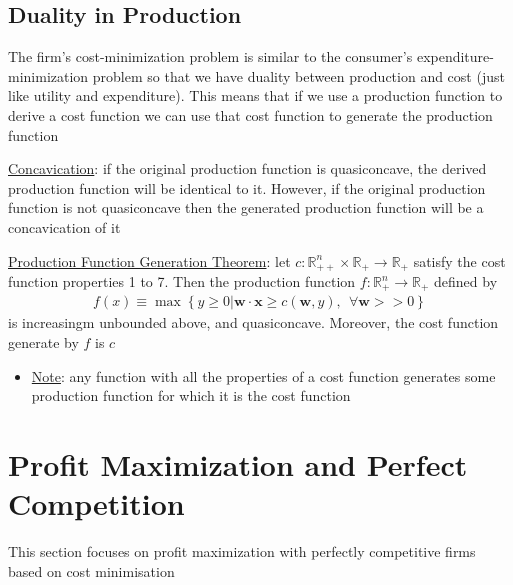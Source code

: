 \documentclass{article}
\begin{document}
\subsection{Duality in Production}
The firm's cost-minimization problem is similar to the consumer's expenditure-minimization problem so that we have duality between production and cost (just like utility and expenditure). This means that if we use a production function to derive a cost function we can use that cost function to generate the production function \par \vspace{0.3em}
  \underline{Concavication}: if the original production function is quasiconcave, the derived production function will be identical to it. However, if the original production function is not quasiconcave then the generated production function will be a concavication of it
  \par
  \underline{Production Function Generation Theorem}: let $c: \mathbb{R}_{++}^{n} \times \mathbb{R}_{+} \rightarrow \mathbb{R}_{+}$ satisfy the cost function properties 1 to 7. Then the production function $f: \mathbb{R}_{+}^{n} \rightarrow \mathbb{R}_{+}$ defined by
  \begin{gather*}
    f(x) \equiv \max \left\{ y \geq 0 | \mathbf{w} \cdot \mathbf{x} \geq c(\mathbf{w}, y), \ \ \forall \mathbf{w} >> 0 \right\}
  \end{gather*}
  is increasingm unbounded above, and quasiconcave. Moreover, the cost function generate by $f$ is $c$
  \begin{itemize}
    \item  \underline{Note}: any function with all the properties of a cost function generates some production function for which it is the cost function
  \end{itemize}
  \par

\newpage

\vspace{2.5mm}
\section{Profit Maximization and Perfect Competition}
This section focuses on profit maximization with perfectly competitive firms based on cost minimisation
\vspace{6mm}
\end{document}
